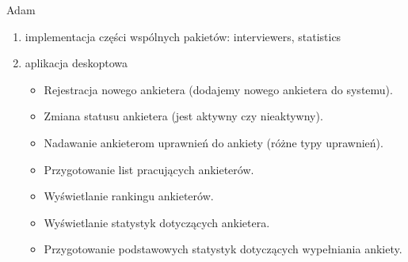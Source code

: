 \documentclass[a4paper,10pt]{beamer}
\begin{document}
		\begin{frame}{Adam}
			\begin{enumerate}
				\item	implementacja części wspólnych pakietów: interviewers, statistics
				\item	aplikacja deskoptowa
				\begin{itemize}
					\item   Rejestracja nowego ankietera (dodajemy nowego ankietera do systemu).
					\item	Zmiana statusu ankietera (jest aktywny czy nieaktywny).
					\item	Nadawanie ankieterom uprawnień do ankiety (różne typy uprawnień).
					\item	Przygotowanie list pracujących ankieterów. 
					\item	Wyświetlanie rankingu ankieterów. 
					\item	Wyświetlanie statystyk dotyczących ankietera.
					\item	Przygotowanie podstawowych statystyk dotyczących wypełniania ankiety. 
				\end{itemize}
			\end{enumerate}
		\end{frame}
		
\end{document}
